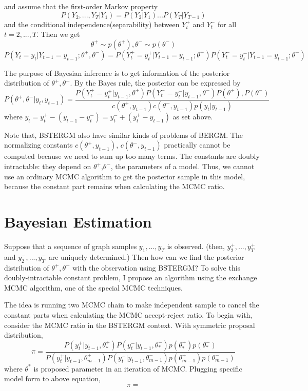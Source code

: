 \documentclass[aspectratio=169,ignorenonframetext,9pt]{beamer}
\theoremstyle{plain}
\theoremstyle{definition}
\begin{document}
and assume that the first-order Markov property
\[P(Y_2,...,Y_T|Y_1)=P(Y_2|Y_1)...P(Y_T|Y_{T-1})\]
and the conditional independence(separability) between $Y_t^+$ and $Y_t^-$ for all $t=2,...,T$.
Then we get
\[\theta^+ \sim p(\theta^+), \theta^- \sim p(\theta^-)\]
\[P(Y_t=y_t|Y_{t-1}=y_{t-1};\theta^+,\theta^-)=P(Y_t^+=y_t^+|Y_{t-1}=y_{t-1};\theta^+) P(Y_t^-=y_t^-|Y_{t-1}=y_{t-1};\theta^-)\]

The purpose of Bayesian inference is to get information of the posterior distribution of $\theta^+,\theta^-$.
By the Bayes rule, the posterior can be expressed by
\[P(\theta^+,\theta^-|y_t, y_{t-1}) = \frac{P(Y_t^+=y_t^+|y_{t-1},\theta^+) P(Y_t^-=y_t^-|y_{t-1},\theta^-)P(\theta^+),P(\theta^-)}{c(\theta^+,y_{t-1})c(\theta^-,y_{t-1})p(y_t|y_{t-1})} \]
where $y_t=y_t^+ - (y_{t-1} - y_t^-) = y_t^- + (y_t^+ - y_{t-1})$ as set above.

Note that, BSTERGM also have similar kinds of problems of BERGM.
The normalizing constants $c(\theta^+,y_{t-1})$, $c(\theta^-,y_{t-1})$ practically cannot be computed because we need to sum up too many terms.
The constants are doubly intractable: they depend on $\theta^+$,$\theta^-$, the parameters of a model.
Thus, we cannot use an ordinary MCMC algorithm to get the posterior sample in this model,
because the constant part remains when calculating the MCMC ratio.


\section{Bayesian Estimation}

Suppose that a sequence of graph samples $y_1,...,y_T$ is observed.
(then, $y_2^+,...,y_T^+$ and $y_2^-,...,y_T^-$ are uniquely determined.) 
Then how can we find the posterior distribution of $\theta^+,\theta^-$ with the observation using BSTERGM?
To solve this doubly-intractable constant problem, I propose an algorithm using the exchange MCMC algorithm,
one of the special MCMC techniques.

The idea is running two MCMC chain to make independent sample to cancel the constant parts
when calculating the MCMC accept-reject ratio.
To begin with, consider the MCMC ratio in the BSTERGM context.
With symmetric proposal distribution,
\[\pi = \frac{P(y_t^+|y_{t-1},\theta_*^+)P(y_t^-|y_{t-1},\theta_*^-)p(\theta_*^+)p(\theta_*^-)}
{P(y_t^+|y_{t-1},\theta_{m-1}^+)P(y_t^-|y_{t-1},\theta_{m-1}^-)p(\theta_{m-1}^+)p(\theta_{m-1}^-)}\]
where $\theta^*$ is proposed parameter in an iteration of MCMC.
Plugging specific model form to above equation,
\[\pi=\] %
\end{document}
